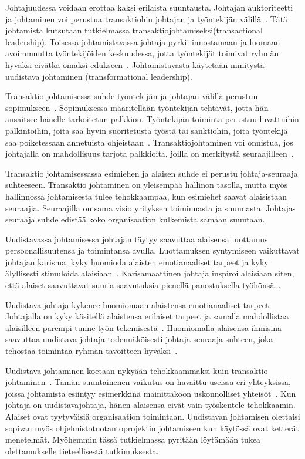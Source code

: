 \documentclass[finnish]{tktltiki2}
\theoremstyle{definition}
\theoremstyle{remark}
\begin{document}
Johtajuudessa voidaan erottaa kaksi erilaista suuntausta. Johtajan auktoriteetti ja johtaminen voi perustua transaktiohin johtajan ja työntekijän välillä~\cite{bass1990transactional}. Tätä johtamista kutsutaan tutkielmassa transaktiojohtamiseksi(transactional leadership). Toisessa johtamistavassa johtaja pyrkii innostamaan ja luomaan avoimmuutta työntekijöiden keskuudessa, jotta työntekijät toimivat ryhmän hyväksi eivätkä omaksi edukseen~\cite{bass1990transactional}. Johtamistavasta käytetään nimitystä uudistava johtaminen (transformational leadership). 

Transaktio johtamisessa suhde työntekijän ja johtajan välillä  perustuu sopimukseen~\cite{bass1990transactional}. Sopimuksessa määritellään työntekijän tehtävät, jotta hän ansaitsee hänelle tarkoitetun palkkion. Työntekijän toiminta perustuu luvattuihin palkintoihin, joita saa hyvin suoritetusta työstä tai sanktiohin, joita työntekijä saa poiketessaan annetuista ohjeistaan~\cite{bass1990transactional}. Transaktiojohtaminen voi onnistua, jos johtajalla on mahdollisuus tarjota palkkioita, joilla on merkitystä seuraajilleen~\cite{bass1990transactional}. 

Transaktio johtamisessassa esimiehen ja alaisen suhde ei perustu johtaja-seuraaja suhteeseen. Transaktio johtaminen on yleisempää hallinon tasolla, mutta myös hallinnossa johtamisesta tulee tehokkaampaa, kun esimiehet saavat alaisistaan seuraajia. Seuraajilla on sama visio yrityksen toiminnasta ja suunnasta. Johtaja-seuraaja suhde edistää koko organisaation kulkemista samaan suuntaan. 

Uudistavassa johtamisessa johtajan täytyy saavuttaa alaisensa luottamus persoonallisuutensa ja toimintansa avulla. Luottamuksen syntymiseen vaikuttavat johtajan karisma, kyky huomioda alaisten emotianaaliset tarpeet ja kyky älyllisesti stimuloida alaisiaan~\cite{bass1990transactional}. Karisamaattinen johtaja inspiroi alaisiaan siten, että alaiset saavuttavat suuria saavutuksia pienellä panostuksella työhönsä~\cite{bass1990transactional}.

Uudistava johtaja kykenee huomiomaan alaistensa emotianaaliset tarpeet. Johtajalla on kyky käsitellä alaistensa erilaiset tarpeet ja samalla mahdollistaa alaisilleen parempi tunne työn tekemisestä~\cite{palmer2001emotional}. Huomiomalla alaisensa ihmisinä saavuttaa uudistava johtaja todennäköisesti johtaja-seuraaja suhteen, joka tehostaa toimintaa ryhmän tavoitteen hyväksi~\cite{raccoon2006leadership}.

Uudistava johtaminen koetaan nykyään tehokkaammaksi kuin transaktio johtaminen~\cite{palmer2001emotional}. Tämän suuntainenen vaikutus on havaittu useissa eri yhteyksissä, joissa johtamista esiintyy esimerkkinä mainittakoon uskonnolliset yhteisöt~\cite{bass1990transactional}. Kun johtaja on uudistavajohtaja, hänen alaisensa eivät vain työskentele tehokkaamin. Alaiset ovat tyytyväisiä organisaation toimintaan.  Uudistavan johtamisen olettaisi sopivan myös ohjelmistotuotantoprojektin johtamiseen kun käytössä ovat ketterät menetelmät. Myöhemmin tässä tutkielmassa pyritään löytämään tukea olettamukselle tieteellisestä tutkimuksesta. 
\end{document}
